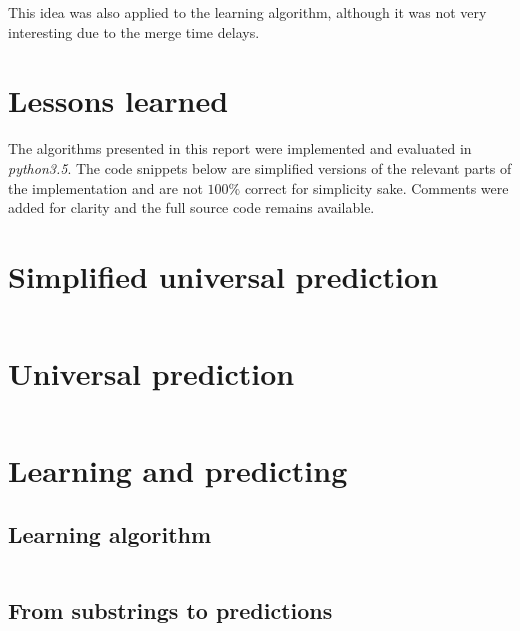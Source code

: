\documentclass[a4paper,12pt]{article}
\begin{document}
  This idea was also applied to the learning algorithm, although it was not very interesting due to the merge time delays.
  
\section*{Lessons learned}




\clearpage
\begin{appendices}

  The algorithms presented in this report were implemented and evaluated
  in \emph{python3.5}. The code snippets below are simplified versions of
  the relevant parts of the implementation and are not $100\%$ correct for
  simplicity sake. Comments were added for clarity and the full source code
  remains available.

  \section{Simplified universal prediction}\label{code_simplified}

    \inputminted[linenos]{python}{code/simplified.py}

  \clearpage
  \section{Universal prediction}\label{code_complete}

    \inputminted[linenos]{python}{code/complete.py}

  \clearpage
  \section{Learning and predicting}

  \subsection{Learning algorithm}\label{code_learning}

      \inputminted[linenos]{python}{code/learning.py}

    \clearpage
    \subsection{From substrings to predictions}\label{code_predicting}

      \inputminted[linenos]{python}{code/predicting.py}

\end{appendices}
\end{document}
